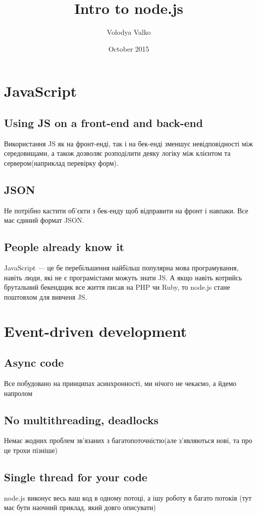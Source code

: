 \documentclass{article}
\title{\LARGE{Intro to node.js}}
\author{Volodya Valko}
\date{October 2015}
\begin{document}
  \maketitle
  \section{JavaScript}
    \subsection{Using JS on a front-end and back-end}
      Використання JS як на фронт-енді, так і на бек-енді зменшує невідповідності
      між середовищами, а також дозволяє розподілити деяку логіку між клієнтом та
      сервером(наприклад перевірку форм).
    \subsection{JSON}
      Не потрібно кастити об’єкти з бек-енду щоб відправити на фронт і навпаки.
      Все має єдиний формат JSON.
    \subsection{People already know it}
      JavaScript --- це бе перебільшення найбільш популярна мова програмування,
      навіть люди, які не є програмістами можуть знати JS. А якщо навіть котрийсь
      брутальний бекендщик все життя писав на PHP чи Ruby, то node.js стане
      поштовхом для вивченя JS.
  \section{Event-driven development}
    \subsection{Async code}
      Все побудовано на принципах асинхронності, ми нічого не чекаємо, а йдемо напролом
    \subsection{No multithreading, deadlocks}
      Немає жодних проблем зв’язаних з багатопоточністю(але з’являються нові, та
      про це трохи пізніше)
    \subsection{Single thread for your code}
      node.js виконує весь ваш код в одному потоці, а ішу роботу в багато потоків
      (тут має бути наочний приклад, який довго описувати)
\end{document}
